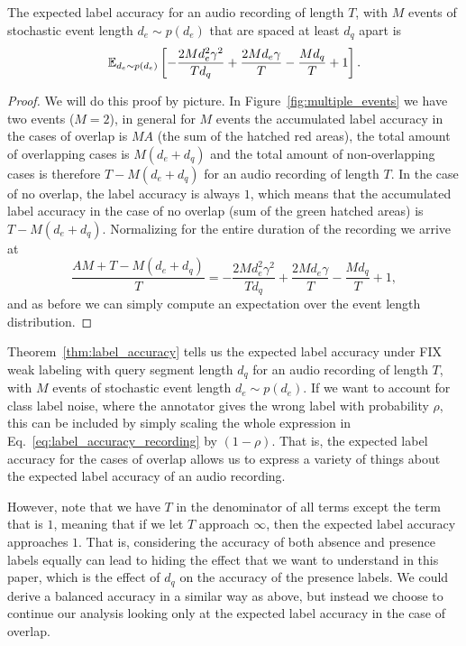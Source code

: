 \begin{theorem}
\label{thm:label_accuracy}
The expected label accuracy for an audio recording of length $T$, with $M$ events of stochastic event length $d_e \sim p(d_e)$ that are spaced at least $d_q$ apart is
\begin{equation}
\label{eq:label_accuracy_recording}
    \mathbb{E}_{d_e\sim p(d_e)}\left[- \frac{2 M d_{e}^{2} \gamma^{2}}{T d_{q}} + \frac{2 M d_{e} \gamma}{T} - \frac{M d_{q}}{T} + 1 \right].
\end{equation}
\begin{proof}
We will do this proof by picture. In Figure~\ref{fig:multiple_events} we have two events ($M=2$), in general for $M$ events the accumulated label accuracy in the cases of overlap is $MA$ (the sum of the hatched red areas), the total amount of overlapping cases is $M(d_e + d_q)$ and the total amount of non-overlapping cases is therefore $T-M(d_e+d_q)$ for an audio recording of length $T$. In the case of no overlap, the label accuracy is always $1$, which means that the accumulated label accuracy in the case of no overlap (sum of the green hatched areas) is $T-M(d_e + d_q)$. Normalizing for the entire duration of the recording we arrive at
\begin{equation}
\frac{AM + T-M(d_e + d_q)}{T} = - \frac{2 M d_{e}^{2} \gamma^{2}}{T d_{q}} + \frac{2 M d_{e} \gamma}{T} - \frac{M d_{q}}{T} + 1,
\end{equation}
and as before we can simply compute an expectation over the event length distribution.
\end{proof}
\end{theorem}

Theorem~\ref{thm:label_accuracy} tells us the expected label accuracy under FIX weak labeling with query segment length $d_q$ for an audio recording of length $T$, with $M$ events of stochastic event length $d_e \sim p(d_e)$. If we want to account for class label noise, where the annotator gives the wrong label with probability $\rho$, this can be included by simply scaling the whole expression in Eq.~\ref{eq:label_accuracy_recording} by $(1-\rho)$. That is, the expected label accuracy for the cases of overlap allows us to express a variety of things about the expected label accuracy of an audio recording. 

However, note that we have $T$ in the denominator of all terms except the term that is $1$, meaning that if we let $T$ approach $\infty$, then the expected label accuracy approaches $1$. That is, considering the accuracy of both absence and presence labels equally can lead to hiding the effect that we want to understand in this paper, which is the effect of $d_q$ on the accuracy of the presence labels. We could derive a balanced accuracy in a similar way as above, but instead we choose to continue our analysis looking only at the expected label accuracy in the case of overlap. %


